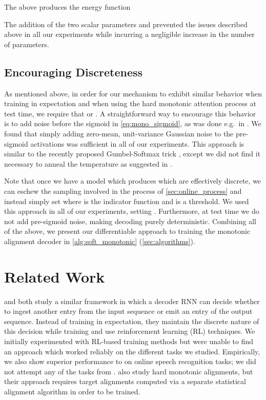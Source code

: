 \documentclass{article}
\begin{document}
The above produces the energy function

The addition of the two scalar parameters  and  prevented the issues described above in all our experiments while incurring a negligible increase in the number of parameters.

\subsection{Encouraging Discreteness}
\label{sec:discreteness}

As mentioned above, in order for our mechanism to exhibit similar behavior when training in expectation and when using the hard monotonic attention process at test time, we require that  or .
A straightforward way to encourage this behavior is to add noise before the sigmoid in \cref{eq:mono_sigmoid}, as was done e.g.\ in .
We found that simply adding zero-mean, unit-variance Gaussian noise to the pre-sigmoid activations was sufficient in all of our experiments.
This approach is similar to the recently proposed Gumbel-Softmax trick , except we did not find it necessary to anneal the temperature as suggested in .

Note that once we have a model which produces  which are effectively discrete, we can eschew the sampling involved in the process of \cref{sec:online_process} and instead simply set  where  is the indicator function and  is a threshold.
We used this approach in all of our experiments, setting .
Furthermore, at test time we do not add pre-sigmoid noise, making decoding purely deterministic.
Combining all of the above, we present our differentiable approach to training the monotonic alignment decoder in \cref{alg:soft_monotonic} (\cref{sec:algorithms}).

\section{Related Work}

 and  both study a similar framework in which a decoder RNN can decide whether to ingest another entry from the input sequence or emit an entry of the output sequence.
Instead of training in expectation, they maintain the discrete nature of this decision while training and use reinforcement learning (RL) techniques.
We initially experimented with RL-based training methods but were unable to find an approach which worked reliably on the different tasks we studied.
Empirically, we also show superior performance to  on online speech recognition tasks; we did not attempt any of the tasks from .
 also study hard monotonic alignments, but their approach requires target alignments computed via a separate statistical alignment algorithm in order to be trained.
\end{document}
